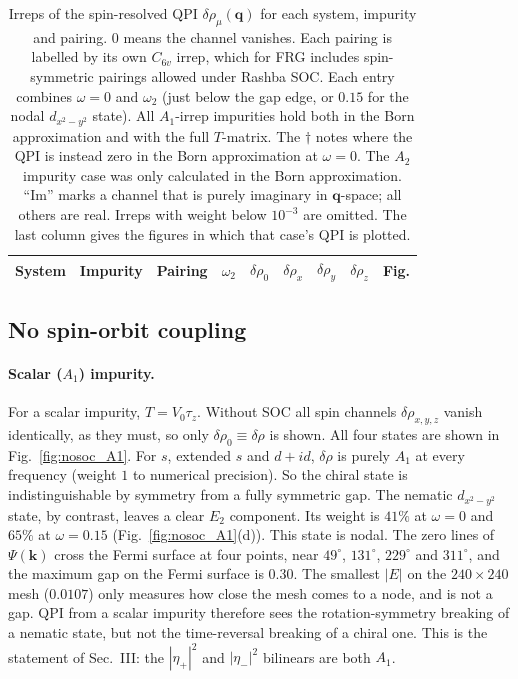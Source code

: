 \documentclass[aps,prb,twocolumn,superscriptaddress,nofootinbib]{revtex4-2}
\newcommand{\bk}{\bm{k}}
\newcommand{\bq}{\bm{q}}
\begin{document}
\begin{table}[tp]
    \caption{Irreps of the spin-resolved QPI $\delta\rho_\mu(\bq)$ for each system, impurity and pairing. $0$ means the channel vanishes.
    Each pairing is labelled by its own $C_{6v}$ irrep, which for FRG includes spin-symmetric pairings allowed under Rashba SOC.
    Each entry combines $\omega = 0$ and $\omega_2$ (just below the gap edge, or $0.15$ for the nodal $d_{x^2-y^2}$ state).
    All $A_1$-irrep impurities hold both in the Born approximation and with the full $T$-matrix. The $\dagger$ notes where the QPI is instead zero in the Born approximation at $\omega=0$. The $A_2$ impurity case was only calculated in the Born approximation.
    ``Im'' marks a channel that is purely imaginary in $\bq$-space; all others are real.
    Irreps with weight below $10^{-3}$ are omitted.
    The last column gives the figures in which that case's QPI is plotted.}
    \label{tab:cases}
    \begin{ruledtabular}
    \begin{tabular}{lllllllll}
        System & Impurity & Pairing & $\omega_2$ & $\delta\rho_0$ & $\delta\rho_x$ & $\delta\rho_y$ & $\delta\rho_z$ & Fig. \\
        \hline
    \end{tabular}
    \end{ruledtabular}
\end{table}

\subsection{No spin-orbit coupling}

\paragraph{Scalar ($A_1$) impurity.}
For a scalar impurity, $\hat T = V_0 \tau_z$.
Without SOC all spin channels $\delta\rho_{x,y,z}$ vanish identically, as they must, so only $\delta\rho_0 \equiv \delta\rho$ is shown.
All four states are shown in Fig.~\ref{fig:nosoc_A1}.
For $s$, extended $s$ and $d+id$, $\delta\rho$ is purely $A_1$ at every frequency (weight $1$ to numerical precision).
So the chiral state is indistinguishable by symmetry from a fully symmetric gap.
The nematic $d_{x^2-y^2}$ state, by contrast, leaves a clear $E_2$ component.
Its weight is $41\%$ at $\omega = 0$ and $65\%$ at $\omega = 0.15$ (Fig.~\ref{fig:nosoc_A1}(d)).
This state is nodal.
The zero lines of $\Psi(\bk)$ cross the Fermi surface at four points, near $49^\circ$, $131^\circ$, $229^\circ$ and $311^\circ$, and the maximum gap on the Fermi surface is $0.30$.
The smallest $|E|$ on the $240 \times 240$ mesh ($0.0107$) only measures how close the mesh comes to a node, and is not a gap.
QPI from a scalar impurity therefore sees the rotation-symmetry breaking of a nematic state, but not the time-reversal breaking of a chiral one.
This is the statement of Sec.~III: the $|\eta_+|^2$ and $|\eta_-|^2$ bilinears are both $A_1$.
\end{document}
